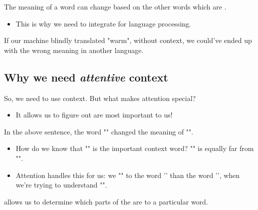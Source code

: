         

        \begin{concept}
            The meaning of a word can change based on the other words which are .

            \begin{itemize}
                \item This is why we need to integrate  for language processing.
            \end{itemize}
        \end{concept}

        If our machine blindly translated "warm", without context, we could've ended up with the wrong meaning in another language.

    \phantom{}


    \subsection{Why we need \textit{attentive} context}

        So, we need to use context. But what makes attention special?

        \begin{itemize}
            \item It allows us to figure out  are most important to us!
        \end{itemize}

        In the above sentence, the word "" changed the meaning of "".

        \begin{itemize}
            \item How do we know that "" is the important context word? "" is equally far from "".

            \item Attention handles this for us: we "" to the word '' than the word '', when we're trying to understand "".\\
        \end{itemize}

        \begin{concept}
             allows us to determine which parts of the  are  to a particular word.
        \end{concept}




